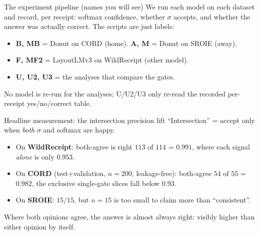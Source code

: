 \documentclass[aspectratio=169]{beamer}
\newcommand{\keybox}[1]{\begin{center}\colorbox{grey!15}{\parbox{0.92\linewidth}{\centering #1}}\end{center}}
\begin{document}
\begin{frame}{The experiment pipeline (names you will see)}
We run each model on each dataset and record, per receipt:
softmax confidence, whether $\sigma$ accepts, and whether the answer
was actually correct. The scripts are just labels:
\begin{itemize}
\item \textbf{B, MB} = Donut on CORD (home). \quad \textbf{A, M} =
Donut on SROIE (away).
\item \textbf{F, MF2} = LayoutLMv3 on WildReceipt (other model).
\item \textbf{U, U2, U3} = the analyses that compare the gates.
\end{itemize}
\keybox{No model is re-run for the analyses; U/U2/U3 only
re-read the recorded per-receipt yes/no/correct table.}
\end{frame}

\begin{frame}{Headline measurement: the intersection precision lift}
``Intersection'' = accept only when \emph{both} $\sigma$ and softmax
are happy.
\vspace{0.6em}
\begin{itemize}
\item On \textbf{WildReceipt}: both-agree is right $113$ of $114$ =
\textcolor{ok}{$0.991$}, where each signal \emph{alone} is only
$0.953$.
\item On \textbf{CORD} (test+validation, $n{=}200$, leakage-free):
both-agree $54$ of $55$ = $0.982$, the exclusive single-gate slices fall below $0.93$.
\item On \textbf{SROIE}: $15/15$, but $n{=}15$ is too small to claim
more than ``consistent''.
\end{itemize}
\keybox{Where both opinions agree, the answer is almost always right:
visibly higher than either opinion by itself.}
\end{frame}
\end{document}
